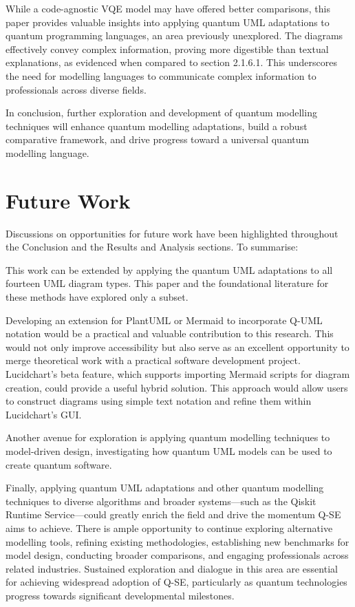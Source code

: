 \documentclass{article}
\begin{document}
While a code-agnostic VQE model may have offered better comparisons, this paper provides valuable insights into applying quantum UML adaptations to quantum programming languages, an area previously unexplored. The diagrams effectively convey complex information, proving more digestible than textual explanations, as evidenced when compared to section 2.1.6.1. This underscores the need for modelling languages to communicate complex information to professionals across diverse fields.

In conclusion, further exploration and development of quantum modelling techniques will enhance quantum modelling adaptations, build a robust comparative framework, and drive progress toward a universal quantum modelling language.

\section{Future Work}

Discussions on opportunities for future work have been highlighted throughout the Conclusion and the Results and Analysis sections. To summarise:

This work can be extended by applying the quantum UML adaptations to all fourteen UML diagram types. This paper and the foundational literature for these methods have explored only a subset.

Developing an extension for PlantUML or Mermaid to incorporate Q-UML notation would be a practical and valuable contribution to this research. This would not only improve accessibility but also serve as an excellent opportunity to merge theoretical work with a practical software development project. Lucidchart's beta feature, which supports importing Mermaid scripts for diagram creation, could provide a useful hybrid solution. This approach would allow users to construct diagrams using simple text notation and refine them within Lucidchart's GUI.

Another avenue for exploration is applying quantum modelling techniques to model-driven design, investigating how quantum UML models can be used to create quantum software.

Finally, applying quantum UML adaptations and other quantum modelling techniques to diverse algorithms and broader systems—such as the Qiskit Runtime Service—could greatly enrich the field and drive the momentum Q-SE aims to achieve. There is ample opportunity to continue exploring alternative modelling tools, refining existing methodologies, establishing new benchmarks for model design, conducting broader comparisons, and engaging professionals across related industries. Sustained exploration and dialogue in this area are essential for achieving widespread adoption of Q-SE, particularly as quantum technologies progress towards significant developmental milestones.
\end{document}
